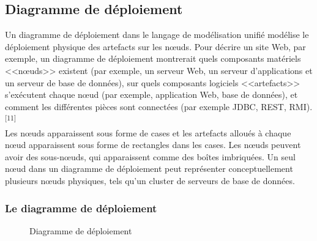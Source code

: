 \documentclass[12pt]{report}
\begin{document}
\newpage

\subsection{Diagramme de déploiement}

Un diagramme de déploiement dans le langage de modélisation unifié modélise le déploiement physique des artefacts sur les nœuds. Pour décrire un site Web, par exemple, un diagramme de déploiement montrerait quels composants matériels <<nœuds>> existent (par exemple, un serveur Web, un serveur d’applications et un serveur de base de données), sur quels composants logiciels <<artefacts>> s’exécutent chaque nœud (par exemple, application Web, base de données), et comment les différentes pièces sont connectées (par exemple JDBC, REST, RMI).\textsuperscript{[11]}
\\
Les nœuds apparaissent sous forme de cases et les artefacts alloués à chaque nœud apparaissent sous forme de rectangles dans les cases. Les nœuds peuvent avoir des sous-nœuds, qui apparaissent comme des boîtes imbriquées. Un seul nœud dans un diagramme de déploiement peut représenter conceptuellement plusieurs nœuds physiques, tels qu'un cluster de serveurs de base de données.

\vspace{0.2in}

\subsubsection{Le diagramme de déploiement}

\vspace{0.2in}

\begin{figure}[h]
\centering
    \centerline{}
    \caption{Diagramme de déploiement}
\end{figure}
\end{document}
